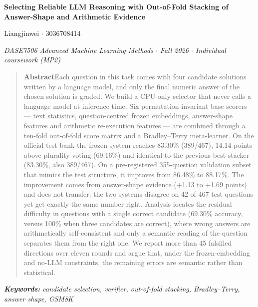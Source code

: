 \documentclass[10pt,a4paper]{article}
\begin{document}
\fontsize{10.5pt}{13pt}\selectfont

\begin{center}
{\LARGE\bfseries Selecting Reliable LLM Reasoning with Out-of-Fold Stacking of Answer-Shape and Arithmetic Evidence\par}
\vspace{6pt}
{\large Liangjinwei  $\cdot$  3036708414\par}
\vspace{2pt}
{\small\itshape DASE7506 Advanced Machine Learning Methods $\cdot$ Fall 2026  $\cdot$  Individual coursework (MP2)\par}
\end{center}
\vspace{3pt}
\begin{quote}
\small
\textbf{Abstract}\quad Each question in this task comes with four candidate solutions written by a language model, and only the final numeric answer of the chosen solution is graded. We build a CPU-only selector that never calls a language model at inference time. Six permutation-invariant base scorers --- text statistics, question-centred frozen embeddings, answer-shape features and arithmetic re-execution features --- are combined through a ten-fold out-of-fold score matrix and a Bradley--Terry meta-learner. On the official test bank the frozen system reaches 83.30\% (389/467), 14.14 points above plurality voting (69.16\%) and identical to the previous best stacker (83.30\%, also 389/467). On a pre-registered 355-question validation subset that mimics the test structure, it improves from 86.48\% to 88.17\%. The improvement comes from answer-shape evidence (+1.13 to +1.69 points) and does not transfer: the two systems disagree on 42 of 467 test questions yet get exactly the same number right. Analysis locates the residual difficulty in questions with a single correct candidate (69.30\% accuracy, versus 100\% when three candidates are correct), where wrong answers are arithmetically self-consistent and only a semantic reading of the question separates them from the right one. We report more than 45 falsified directions over eleven rounds and argue that, under the frozen-embedding and no-LLM constraints, the remaining errors are semantic rather than statistical.
\end{quote}
\vspace{-6pt}
{\small\itshape \textbf{Keywords:} candidate selection, verifier, out-of-fold stacking, Bradley--Terry, answer shape, GSM8K\par}
\vspace{4pt}
\end{document}
